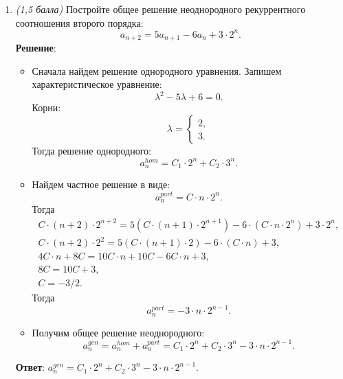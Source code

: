 \documentclass{article}
\begin{document}
\begin{enumerate}
    \item \textit{(1,5 балла)} Постройте общее решение неоднородного рекуррентного соотношения второго порядка:
    $$a_{n+2} = 5a_{n+1} - 6a_n + 3 \cdot 2^n.$$
    \textbf{Решение}:
    \begin{itemize}
      \item Сначала найдем решение однородного уравнения. Запишем характеристическое уравнение:
      \begin{equation}
        \lambda^2 - 5\lambda + 6 = 0.
      \end{equation}
      Корни:
      \begin{equation}
        \lambda = \begin{cases}
          2, \\
          3.
        \end{cases}
      \end{equation}
      Тогда решение однородного:
      \begin{equation}
        a_n^{hom} = C_1 \cdot 2^n + C_2 \cdot 3^n.
      \end{equation}
      \item Найдем частное решение в виде:
      \begin{equation}
        a_n^{part} = C \cdot n \cdot 2^n.
      \end{equation}
      Тогда
      \begin{eqnarray}
        C \cdot (n+2) \cdot 2^{n+2} = 5(C \cdot (n+1) \cdot 2^{n+1}) - 6\cdot (C \cdot n \cdot 2^n) + 3 \cdot 2^n, \\
        C \cdot (n+2) \cdot 2^{2} = 5(C \cdot (n+1) \cdot 2) - 6\cdot (C \cdot n) + 3, \\
        4C \cdot n + 8C = 10C \cdot n + 10C - 6C \cdot n + 3, \\
        8C = 10C + 3, \\
        C = -3/2.
      \end{eqnarray}
      Тогда
      \begin{equation}
        a_n^{part} = -3 \cdot n \cdot 2^{n-1}.
      \end{equation}
      \item Получим общее решение неоднородного:
      \begin{equation}
        a_n^{gen} = a_n^{hom} + a_n^{part} = C_1 \cdot 2^n + C_2 \cdot 3^n - 3 \cdot n \cdot 2^{n-1}.
      \end{equation}
    \end{itemize}

    \textbf{Ответ}:
    $a_n^{gen} = C_1 \cdot 2^n + C_2 \cdot 3^n - 3 \cdot n \cdot 2^{n-1}.$

  \end{enumerate}
\end{document}
